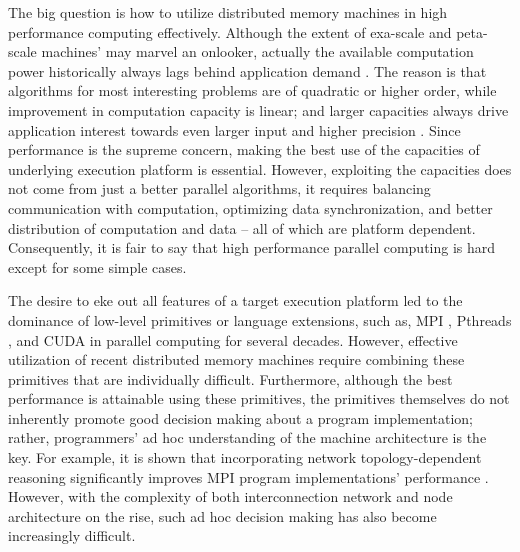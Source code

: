 \documentclass[ASNA,twocolumn]{USG} %
\begin{document}
The big question is how to utilize distributed memory machines in high performance computing effectively. Although the extent of exa-scale and peta-scale machines' may marvel an onlooker, actually the available computation power historically always lags behind application demand \citep{Snyder:1986:TAS:17814.17826}. The reason is that algorithms for most interesting problems are of quadratic or higher order, while improvement in computation capacity is linear; and larger capacities always drive application interest towards even larger input and higher precision \citep{10.1145/42411.42415}. Since performance is the supreme concern, making the best use of the capacities of underlying execution platform is essential. However, exploiting the capacities does not come from just a better parallel algorithms, it requires balancing communication with computation, optimizing data synchronization, and better distribution of computation and data \citep{Foster:1995:DBP:527029} -- all of which are platform dependent. Consequently, it is fair to say that high performance parallel computing is hard except for some simple cases. 

The desire to eke out all features of a target execution platform led to the dominance of low-level primitives or language extensions, such as, MPI \citep{Walker96mpi:a}, Pthreads \citep{10.5555/263953}, and CUDA \citep{Nickolls:2008:SPP:1365490.1365500} in parallel computing for several decades. However, effective utilization of recent distributed memory machines require combining these primitives that are individually difficult. Furthermore, although the best performance is attainable using these primitives, the primitives themselves do not inherently promote good decision making about a program implementation; rather, programmers' ad hoc understanding of the machine architecture is the key. For example, it is shown that incorporating network topology-dependent reasoning significantly improves MPI program implementations' performance \citep{10.1145/2488551.2488564}. However, with the complexity of both interconnection network and node architecture on the rise, such ad hoc decision making has also become increasingly difficult.
\end{document}
